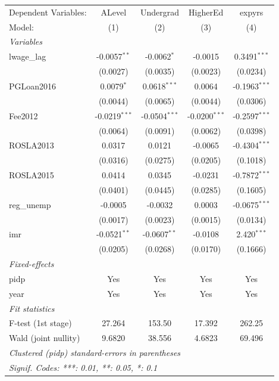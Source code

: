 
\begingroup
\centering
\begin{tabular}{lcccc}
   \tabularnewline \midrule \midrule
   Dependent Variables: & ALevel          & Undergrad       & HigherEd        & expyrs\\  
   Model:               & (1)             & (2)             & (3)             & (4)\\  
   \midrule
   \emph{Variables}\\
   lwage\_lag           & -0.0057$^{**}$  & -0.0062$^{*}$   & -0.0015         & 0.3491$^{***}$\\   
                        & (0.0027)        & (0.0035)        & (0.0023)        & (0.0234)\\   
   PGLoan2016           & 0.0079$^{*}$    & 0.0618$^{***}$  & 0.0064          & -0.1963$^{***}$\\   
                        & (0.0044)        & (0.0065)        & (0.0044)        & (0.0306)\\   
   Fee2012              & -0.0219$^{***}$ & -0.0504$^{***}$ & -0.0200$^{***}$ & -0.2597$^{***}$\\   
                        & (0.0064)        & (0.0091)        & (0.0062)        & (0.0398)\\   
   ROSLA2013            & 0.0317          & 0.0121          & -0.0065         & -0.4304$^{***}$\\   
                        & (0.0316)        & (0.0275)        & (0.0205)        & (0.1018)\\   
   ROSLA2015            & 0.0414          & 0.0345          & -0.0231         & -0.7872$^{***}$\\   
                        & (0.0401)        & (0.0445)        & (0.0285)        & (0.1605)\\   
   reg\_unemp           & -0.0005         & -0.0032         & 0.0003          & -0.0675$^{***}$\\   
                        & (0.0017)        & (0.0023)        & (0.0015)        & (0.0134)\\   
   imr                  & -0.0521$^{**}$  & -0.0607$^{**}$  & -0.0108         & 2.420$^{***}$\\   
                        & (0.0205)        & (0.0268)        & (0.0170)        & (0.1666)\\   
   \midrule
   \emph{Fixed-effects}\\
   pidp                 & Yes             & Yes             & Yes             & Yes\\  
   year                 & Yes             & Yes             & Yes             & Yes\\  
   \midrule
   \emph{Fit statistics}\\
   F-test (1st stage)   & 27.264          & 153.50          & 17.392          & 262.25\\  
   Wald (joint nullity) & 9.6820          & 38.556          & 4.6823          & 69.496\\  
   \midrule \midrule
   \multicolumn{5}{l}{\emph{Clustered (pidp) standard-errors in parentheses}}\\
   \multicolumn{5}{l}{\emph{Signif. Codes: ***: 0.01, **: 0.05, *: 0.1}}\\
\end{tabular}
\par\endgroup



